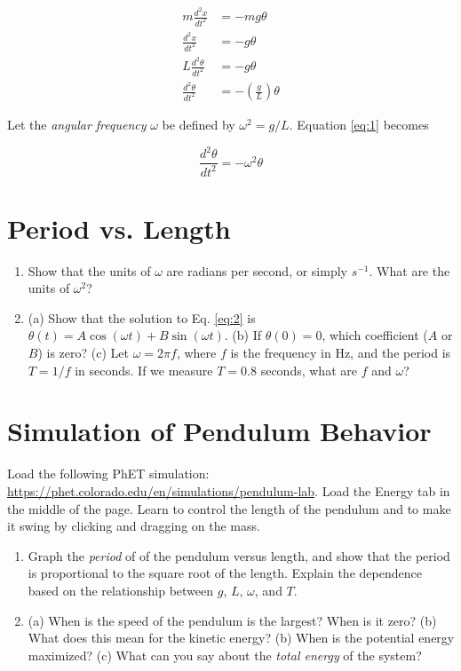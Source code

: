 \documentclass{article}
\begin{document}
\begin{align}
m \frac{d^2 x}{dt^2} &= -mg\theta \\
\frac{d^2 x}{dt^2} &= -g\theta \\
L\frac{d^2 \theta}{dt^2} &= -g\theta \\
\frac{d^2 \theta}{dt^2} &= -\left(\frac{g}{L}\right)\theta \label{eq:1}
\end{align}

Let the \textit{angular frequency} $\omega$ be defined by $\omega^2 = g/L$.  Equation \ref{eq:1} becomes

\begin{equation}
\frac{d^2 \theta}{dt^2} = -\omega^2\theta \label{eq:2}
\end{equation}

\vspace{2cm}

\section{Period vs. Length}

\begin{enumerate}
\item Show that the units of $\omega$ are radians per second, or simply $s^{-1}$. What are the units of $\omega^2$? \\ \vspace{1.5cm}
\item (a) Show that the solution to Eq. \ref{eq:2} is $\theta(t) = A\cos(\omega t) + B\sin(\omega t)$. (b) If $\theta(0) = 0$, which coefficient ($A$ or $B$) is zero? (c) Let $\omega = 2\pi f$, where $f$ is the frequency in Hz, and the period is $T=1/f$ in seconds.  If we measure $T=0.8$ seconds, what are $f$ and $\omega$? \\ \vspace{3cm}
\end{enumerate}

\section{Simulation of Pendulum Behavior}

Load the following PhET simulation: \url{https://phet.colorado.edu/en/simulations/pendulum-lab}.  Load the Energy tab in the middle of the page.  Learn to control the length of the pendulum and to make it swing by clicking and dragging on the mass.

\begin{enumerate}
\item Graph the \textit{period} of of the pendulum versus length, and show that the period is proportional to the square root of the length. Explain the dependence based on the relationship between $g$, $L$, $\omega$, and $T$. \\ \vspace{3cm}
\item (a) When is the speed of the pendulum is the largest?  When is it zero?  (b) What does this mean for the kinetic energy?  (b) When is the potential energy maximized?  (c) What can you say about the \textit{total energy} of the system?
\end{enumerate}
\end{document}
